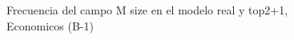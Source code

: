 \begin{figure}[H]
    \centering
    
    \caption{Frecuencia del campo M size en el modelo real y top2+1, Economicos (B-1)}
    \label{frecuency-M Size-top2+1}
\end{figure}